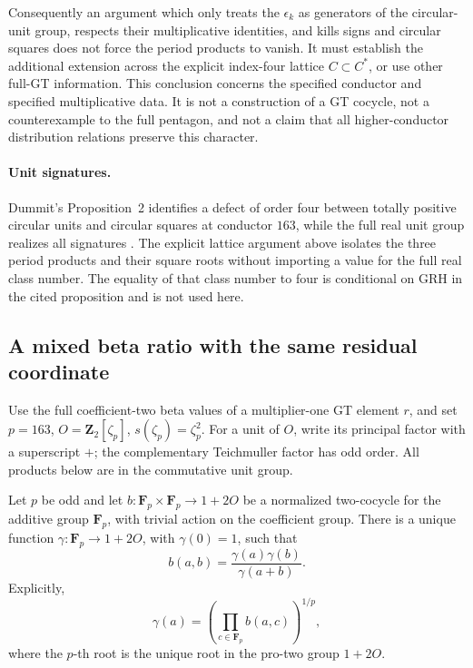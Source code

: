 Consequently an argument which only treats the \(\epsilon_k\)
as generators of the circular-unit group, respects their
multiplicative identities, and kills signs and circular squares
does not force the period products to vanish.  It must establish
the additional extension across the explicit index-four lattice
\(C\subset C^*\), or use other full-GT information.
This conclusion concerns the specified conductor and specified
multiplicative data.  It is not a construction of a GT cocycle,
not a counterexample to the full pentagon, and not a claim that
all higher-conductor distribution relations preserve this character.

\paragraph{Unit signatures.}
Dummit's Proposition~2 identifies a defect of order four between
totally positive circular units and circular squares at conductor
\(163\), while the full real unit group realizes all signatures
\cite[Proposition~2, pp.~209--210]{Dummit2020}.
The explicit lattice argument above isolates the three period products
and their square roots without importing a value for the full real
class number.  The equality of that class number to four is conditional on GRH
in the cited proposition and is not used here.

\subsection{A mixed beta ratio with the same residual coordinate}

Use the full coefficient-two beta values of a multiplier-one GT element
\(r\), and set \(p=163\), \(O=\mathbf Z_2[\zeta_p]\),
\(s(\zeta_p)=\zeta_p^2\).  For a unit of \(O\), write its
principal factor with a superscript \(+\); the complementary
Teichmuller factor has odd order.  All products below are in the
commutative unit group.

\begin{lemma}
\label{lem:finite-cyclic-principal-gamma}
Let \(p\) be odd and let
\(b:\mathbf F_p\times\mathbf F_p\to1+2O\) be a normalized
two-cocycle for the additive group \(\mathbf F_p\), with trivial
action on the coefficient group.  There is a unique function
\(\gamma:\mathbf F_p\to1+2O\), with \(\gamma(0)=1\), such that
\[
 b(a,b)=\frac{\gamma(a)\gamma(b)}{\gamma(a+b)}.
\]
Explicitly,
\[
 \gamma(a)=\left(\prod_{c\in\mathbf F_p}b(a,c)\right)^{1/p},
\]
where the \(p\)-th root is the unique root in the pro-two group
\(1+2O\).
\end{lemma}

